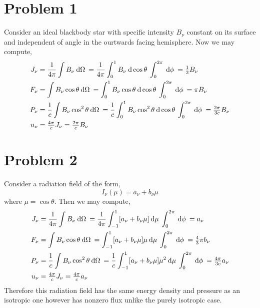 \documentclass[12pt]{article}
\begin{document}

\section*{Problem 1}

Consider an ideal blackbody star with specific intensity $B_\nu$ constant on its surface and independent of angle in the ourtwards facing hemisphere. Now we may compute,
\begin{align*}
J_\nu & = \frac{1}{4 \pi} \int B_\nu \: \mathrm{d}\Omega \: = \frac{1}{4 \pi} \int_0^1 B_\nu \: \mathrm{d}\cos{\theta} \: \int_0^{2 \pi} \: \mathrm{d}\phi \: = \tfrac{1}{2} B_\nu
\\
F_\nu & = \int B_\nu \cos{\theta} \: \mathrm{d}\Omega \: = \int_0^1 B_\nu \cos{\theta} \: \mathrm{d}\cos{\theta} \: \int_0^{2\pi} \: \mathrm{d}\phi \: = \pi B_\nu
\\
P_\nu & = \frac{1}{c} \int B_\nu \cos^2{\theta} \: \mathrm{d}\Omega \: = \frac{1}{c} \int_0^1 B_\nu \cos^2{\theta} \: \mathrm{d}\cos{\theta} \: \int_0^{2\pi} \: \mathrm{d}\phi \: = \tfrac{2 \pi}{3 c} B_\nu
\\
u_\nu & = \tfrac{4 \pi}{c} J_\nu = \tfrac{2 \pi}{c}  B_\nu 
\end{align*}

\section*{Problem 2}

Consider a radiation field of the form,
\[ I_\nu(\mu) = a_\nu + b_\nu \mu \]
where $\mu = \cos{\theta}$. 
Then we may compute,
\begin{align*}
J_\nu & = \frac{1}{4 \pi} \int B_\nu \: \mathrm{d}\Omega \: = \frac{1}{4 \pi} \int_{-1}^1 [a_\nu + b_\nu \mu ] \: \mathrm{d}\mu \: \int_0^{2 \pi} \: \mathrm{d}\phi \: = a_\nu
\\
F_\nu & = \int B_\nu \cos{\theta} \: \mathrm{d}\Omega \: = \int_{-1}^1 [a_\nu + b_\nu \mu ] \mu \: \mathrm{d}\mu \: \int_0^{2\pi} \: \mathrm{d}\phi \: = \tfrac{4}{3} \pi b_\nu
\\
P_\nu & = \frac{1}{c} \int B_\nu \cos^2{\theta} \: \mathrm{d}\Omega \: = \frac{1}{c} \int_{-1}^1 [a_\nu + b_\nu \mu ] \mu^2 \: \mathrm{d}\mu \: \int_0^{2\pi} \: \mathrm{d}\phi \: = \tfrac{4 \pi}{3c} a_\nu 
\\
u_\nu & = \tfrac{4 \pi}{c} J_\nu = \tfrac{4 \pi}{c}  a_\nu 
\end{align*}
Therefore this radiation field has the same energy density and pressure as an isotropic one however has nonzero flux unlike the purely isotropic case. 
\end{document}
